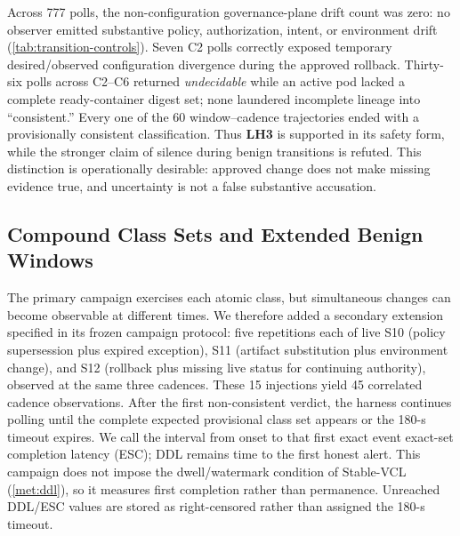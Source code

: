 \begin{table}[t]
\centering
\caption{Transition-Inclusive Benign Controls. Non-Configuration
Governance-Plane Drift Counts Substantive Policy, Authorization, Intent, or
Environment Outcomes; Configuration-Convergence and Epistemic Outcomes Are
Reported Separately.}
\label{tab:transition-controls}
\scriptsize
\resizebox{\columnwidth}{!}{}
\end{table}

Across 777 polls, the non-configuration governance-plane drift count was zero:
no observer emitted substantive policy, authorization, intent, or environment
drift (\cref{tab:transition-controls}). Seven C2 polls
correctly exposed temporary desired/observed configuration divergence during
the approved rollback. Thirty-six polls across C2--C6 returned
\emph{undecidable} while an active pod lacked a complete ready-container
digest set; none laundered incomplete lineage into ``consistent.'' Every one
of the 60 window--cadence trajectories ended with a provisionally consistent
classification. Thus \textbf{LH3} is
supported in its safety form, while the stronger claim of silence during
benign transitions is refuted. This distinction is operationally desirable:
approved change does not make missing evidence true, and uncertainty is not a
false substantive accusation.

\subsection{Compound Class Sets and Extended Benign Windows}
The primary campaign exercises each atomic class, but simultaneous changes
can become observable at different times. We therefore added a secondary
extension specified in its frozen campaign protocol: five repetitions each
of live S10 (policy supersession
plus expired exception), S11 (artifact substitution plus environment
change), and S12 (rollback plus missing live status for continuing authority),
observed at the same three cadences. These 15 injections yield 45 correlated
cadence observations. After the first non-consistent verdict, the harness
continues polling until the complete expected provisional class set appears or the 180-s
timeout expires. We call the interval from onset to that first exact event
exact-set completion latency (ESC); DDL remains time to the first honest alert.
This campaign does not impose the dwell/watermark condition of Stable-VCL
(\cref{met:ddl}), so it measures first completion rather than permanence.
Unreached DDL/ESC values are stored as right-censored rather than assigned the
180-s timeout.

